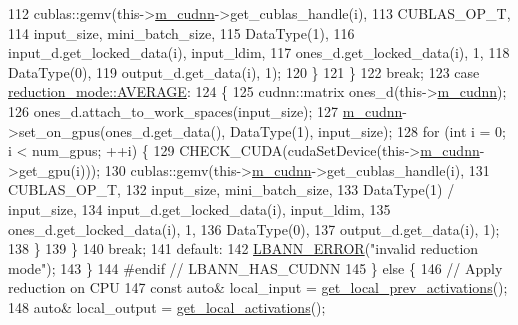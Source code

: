 \begin{DoxyCode}
112             cublas::gemv(this->\hyperlink{classlbann_1_1Layer_a08dbb94239e3b8c96329786c57c72e21}{m\_cudnn}->get\_cublas\_handle(i),
113                          CUBLAS\_OP\_T,
114                          input\_size, mini\_batch\_size,
115                          DataType(1),
116                          input\_d.get\_locked\_data(i), input\_ldim,
117                          ones\_d.get\_locked\_data(i), 1,
118                          DataType(0),
119                          output\_d.get\_data(i), 1);
120           \}
121         \}
122         \textcolor{keywordflow}{break};
123       \textcolor{keywordflow}{case} \hyperlink{namespacelbann_a5975e1fb530a267728bfb01dc5c1be9ba16de38737a9f8366e9b2042b4e9b6290}{reduction\_mode::AVERAGE}:
124         \{
125           cudnn::matrix ones\_d(this->\hyperlink{classlbann_1_1Layer_a08dbb94239e3b8c96329786c57c72e21}{m\_cudnn});
126           ones\_d.attach\_to\_work\_spaces(input\_size);
127           \hyperlink{classlbann_1_1Layer_a08dbb94239e3b8c96329786c57c72e21}{m\_cudnn}->set\_on\_gpus(ones\_d.get\_data(), DataType(1), input\_size);
128           \textcolor{keywordflow}{for} (\textcolor{keywordtype}{int} i = 0; i < num\_gpus; ++i) \{
129             CHECK\_CUDA(cudaSetDevice(this->\hyperlink{classlbann_1_1Layer_a08dbb94239e3b8c96329786c57c72e21}{m\_cudnn}->get\_gpu(i)));
130             cublas::gemv(this->\hyperlink{classlbann_1_1Layer_a08dbb94239e3b8c96329786c57c72e21}{m\_cudnn}->get\_cublas\_handle(i),
131                          CUBLAS\_OP\_T,
132                          input\_size, mini\_batch\_size,
133                          DataType(1) / input\_size,
134                          input\_d.get\_locked\_data(i), input\_ldim,
135                          ones\_d.get\_locked\_data(i), 1,
136                          DataType(0),
137                          output\_d.get\_data(i), 1);
138           \}
139         \}
140         \textcolor{keywordflow}{break};
141       \textcolor{keywordflow}{default}:
142         \hyperlink{base_8hpp_a80b1d707117e968a6951b7222e4b2b87}{LBANN\_ERROR}(\textcolor{stringliteral}{"invalid reduction mode"});
143       \}
144 \textcolor{preprocessor}{    #endif // LBANN\_HAS\_CUDNN}
145     \} \textcolor{keywordflow}{else} \{
146       \textcolor{comment}{// Apply reduction on CPU}
147       \textcolor{keyword}{const} \textcolor{keyword}{auto}& local\_input = \hyperlink{classlbann_1_1Layer_a35397843bb0c84030000c7d872229acb}{get\_local\_prev\_activations}();
148       \textcolor{keyword}{auto}& local\_output = \hyperlink{classlbann_1_1Layer_a4248f27acebf72b7b7b3ee39c8bcb62a}{get\_local\_activations}();

\end{DoxyCode}

